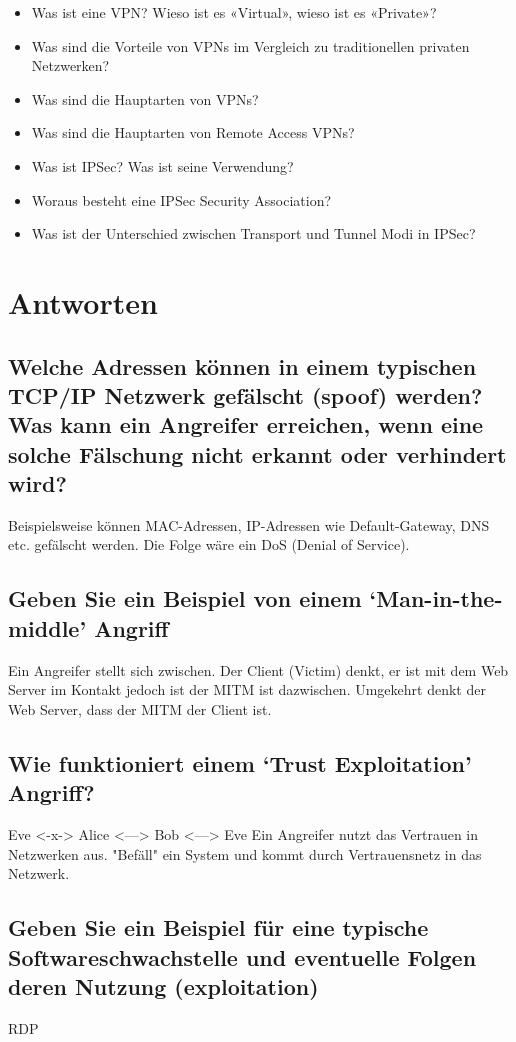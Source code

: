 \begin{itemize}
    \item Was ist eine VPN? Wieso ist es «Virtual», wieso ist es «Private»?
    \item Was sind die Vorteile von VPNs im Vergleich zu traditionellen privaten Netzwerken?
    \item Was sind die Hauptarten von VPNs?
    \item Was sind die Hauptarten von Remote Access VPNs?
    \item Was ist IPSec? Was ist seine Verwendung?
    \item Woraus besteht eine IPSec Security Association?
    \item Was ist der Unterschied zwischen Transport und Tunnel Modi in IPSec?
\end{itemize}

\section{Antworten}
\subsection*{Welche Adressen können in einem typischen TCP/IP Netzwerk gefälscht (spoof) werden? Was kann ein Angreifer erreichen, wenn eine solche Fälschung nicht erkannt oder verhindert wird?}
Beispielsweise können MAC-Adressen, IP-Adressen wie Default-Gateway, DNS etc. gefälscht werden. Die Folge wäre ein DoS (Denial of Service).
\subsection*{Geben Sie ein Beispiel von einem ‘Man-in-the-middle’ Angriff}
Ein Angreifer stellt sich zwischen. Der Client (Victim) denkt, er ist mit dem Web Server im Kontakt jedoch ist der MITM ist dazwischen. Umgekehrt denkt der Web Server, dass der MITM der Client ist.
\subsection*{Wie funktioniert einem ‘Trust Exploitation’ Angriff?}
Eve <-x-> Alice <---> Bob <---> Eve
Ein Angreifer nutzt das Vertrauen in Netzwerken aus. "Befäll" ein System und kommt durch Vertrauensnetz in das Netzwerk.
\subsection*{Geben Sie ein Beispiel für eine typische Softwareschwachstelle und eventuelle Folgen deren Nutzung (exploitation)}
RDP
